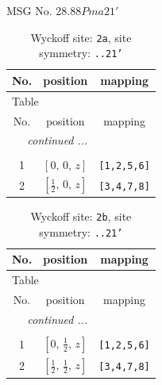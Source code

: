 \documentclass[fleqn,8pt]{jsarticle}
\begin{document}
\setcounter{MaxMatrixCols}{32}

\renewcommand{\tablename}{Table~}
\renewcommand{\figurename}{Figure~}
\begin{center}
\LARGE
MSG No. 28.88\quad$Pma21'$
\end{center}
\renewcommand{\arraystretch}{1.2}
\begin{longtable}{ccc}
\caption{Wyckoff site: {\tt 2a}, site symmetry: {\tt ..21'}}
 \\
 \hline \hline
No. & position & mapping \\ \hline \endfirsthead

\multicolumn{2}{l}{\tablename\ \thetable{}} \\
 \hline \hline
No. & position & mapping \\ \hline \endhead

 \hline \hline
\multicolumn{2}{r}{\footnotesize\it continued ...} \\ \endfoot

 \hline \hline
\multicolumn{2}{r}{} \\ \endlastfoot

1 & $\left[ 0,\, 0,\, z \right]$ & {\tt [1,2,5,6]} \\ \hline
2 & $\left[ \frac{1}{2},\, 0,\, z \right]$ & {\tt [3,4,7,8]} \\
\end{longtable}
\renewcommand{\arraystretch}{1.2}
\begin{longtable}{ccc}
\caption{Wyckoff site: {\tt 2b}, site symmetry: {\tt ..21'}}
 \\
 \hline \hline
No. & position & mapping \\ \hline \endfirsthead

\multicolumn{2}{l}{\tablename\ \thetable{}} \\
 \hline \hline
No. & position & mapping \\ \hline \endhead

 \hline \hline
\multicolumn{2}{r}{\footnotesize\it continued ...} \\ \endfoot

 \hline \hline
\multicolumn{2}{r}{} \\ \endlastfoot

1 & $\left[ 0,\, \frac{1}{2},\, z \right]$ & {\tt [1,2,5,6]} \\ \hline
2 & $\left[ \frac{1}{2},\, \frac{1}{2},\, z \right]$ & {\tt [3,4,7,8]} \\
\end{longtable}
\renewcommand{\arraystretch}{1.2}
\end{document}
